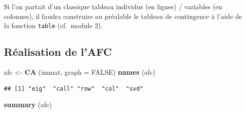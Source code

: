\documentclass[]{book}
\newenvironment{Shaded}{\begin{snugshade}}{\end{snugshade}}
\newcommand{\DataTypeTok}[1]{\textcolor[rgb]{0.13,0.29,0.53}{#1}}
\newcommand{\KeywordTok}[1]{\textcolor[rgb]{0.13,0.29,0.53}{\textbf{#1}}}
\newcommand{\NormalTok}[1]{#1}
\newcommand{\OtherTok}[1]{\textcolor[rgb]{0.56,0.35,0.01}{#1}}
\newcommand{\StringTok}[1]{\textcolor[rgb]{0.31,0.60,0.02}{#1}}
\begin{document}
Si l'on partait d'un classique tableau individus (en lignes) / variables (en colonnes), il faudra construire au préalable le tableau de contingence à l'aide de la fonction \texttt{table} (cf.~module 2).

\hypertarget{realisation-de-lafc}{%
\subsection{Réalisation de l'AFC}\label{realisation-de-lafc}}

\begin{Shaded}
\begin{Highlighting}[]
\NormalTok{afc <-}\StringTok{ }\KeywordTok{CA}\NormalTok{ (immat, }\DataTypeTok{graph =} \OtherTok{FALSE}\NormalTok{)}
\KeywordTok{names}\NormalTok{ (afc)}
\end{Highlighting}
\end{Shaded}

\begin{verbatim}
## [1] "eig"  "call" "row"  "col"  "svd"
\end{verbatim}

\begin{Shaded}
\begin{Highlighting}[]
\KeywordTok{summary}\NormalTok{ (afc)}
\end{Highlighting}
\end{Shaded}
\end{document}
